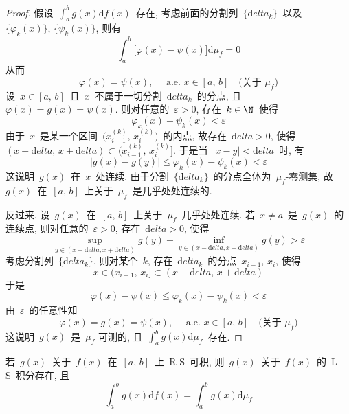 \begin{proof}
假设~$\int_a^b g(x) \mathrm{d} f(x)$~存在, 考虑前面的分割列~$\{\mathrm{d}elta_k\}$~以及~$\{\varphi_k(x)\}, \, \{\psi_k(x)\}$, 则有
\[
\int_a^b \big[\varphi(x) - \psi(x) \big] \mathrm{d} \mu_f = 0
\]
从而
\[
\varphi(x)=\psi(x), \quad \mbox{~a.e.~} x \in [a,\,b] \quad \mbox{(关于~$\mu_f$)}
\]
设~$x \in [a,\,b]$~且~$x$~不属于一切分割~$\mathrm{d}elta_k$~的分点, 且~$\varphi(x)=g(x)=\psi(x)$. 则对任意的~$\varepsilon > 0$, 存在~$k \in \N$~使得
\[
\varphi_k(x) - \psi_k(x) < \varepsilon
\]
由于~$x$~是某一个区间~$\big( x_{i-1}^{(k)},\,x_i^{(k)} \big)$~的内点, 故存在~$\mathrm{d}elta > 0$, 使得~$(x-\mathrm{d}elta,\,x+\mathrm{d}elta) \subset \big( x_{i-1}^{(k)},\,x_i^{(k)} \big]$. 于是当~$|x-y| < \mathrm{d}elta$~时, 有
\[
\big| g(x) - g(y) \big| \leqslant \varphi_k(x) - \psi_k(x) < \varepsilon
\]
这说明~$g(x)$~在~$x$~处连续. 由于分割~$\{\mathrm{d}elta_k\}$~的分点全体为~$\mu_f$-零测集, 故~$g(x)$~在~$[a,\,b]$~上关于~$\mu_f$~是几乎处处连续的.

反过来, 设~$g(x)$~在~$[a,\,b]$~上关于~$\mu_f$~几乎处处连续. 若~$x \neq a$~是~$g(x)$~的连续点, 则对任意的~$\varepsilon > 0$, 存在~$\mathrm{d}elta > 0$, 使得
\[
\sup_{y \in (x-\mathrm{d}elta,x+\mathrm{d}elta)} g(y) - \inf_{y \in (x-\mathrm{d}elta,x+\mathrm{d}elta)} g(y) > \varepsilon
\]
考虑分割列~$\{\mathrm{d}elta_k\}$, 则对某个~$k$, 存在~$\mathrm{d}elta_k$~的分点~$x_{i-1},\,x_i$, 使得
\[
x \in (x_{i-1},\,x_i] \subset (x-\mathrm{d}elta,\,x+\mathrm{d}elta)
\]
于是
\[
\varphi(x) - \psi(x) \leqslant \varphi_k(x) - \psi_k(x) < \varepsilon
\]
由~$\varepsilon$~的任意性知
\[
\varphi(x)=g(x)=\psi(x), \quad \mbox{~a.e.~} x \in [a,\,b] \quad \mbox{(关于~$\mu_f$)}
\]
这说明~$g(x)$~是~$\mu_f$-可测的, 且~$\int_a^b g(x) \mathrm{d} \mu_f$~存在.
\end{proof}

\begin{Theorem}
若~$g(x)$~关于~$f(x)$~在~$[a,\,b]$~上~R-S~可积, 则~$g(x)$~关于~$f(x)$~的~L-S~积分存在, 且
\[
\int_a^b g(x) \mathrm{d} f(x) = \int_a^b g(x) \mathrm{d} \mu_f
\]
\end{Theorem}